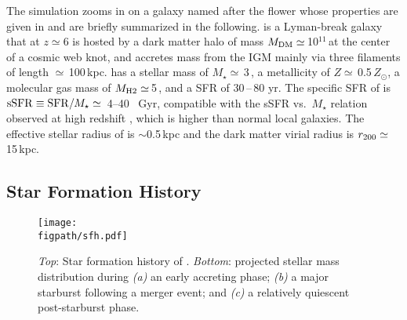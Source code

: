 \IfFileExists{emulateapjlegacy.cls}{\documentclass[iop]{emulateapjlegacy}}{\documentclass[iop]{emulateapj}}
\def\figpath{./Fig}
\begin{document}
The simulation zooms in on a galaxy named after the flower \flower whose properties are given in \citet{Pallottini17a} and are briefly summarized in the following. \flower is a Lyman-break galaxy that at $z\simeq 6$ is hosted by a dark matter halo of mass $M_{\rm DM}\simeq$\,10$^{11}$\,\Msun at the center of a cosmic web knot, and accretes mass from the IGM mainly via three filaments of length $\simeq$\,100\,kpc. \flower has a stellar mass of $M_\star\simeq$\,3\,\Msun, a metallicity of $Z\simeq$\,0.5\,$Z_{\odot}$, a molecular gas mass of $M_{\rm H2}\simeq$\,5\,\Msun, and a SFR of 30\,--\,80\,\Msun\,yr\pmOne.
%
The specific SFR of \flower is ${\rm sSFR} \equiv {\rm SFR}/M_{\star} \simeq$~4--40 ~Gyr\pmOne, compatible with the sSFR vs.\ $M_{\star}$ relation observed at high redshift \citep{Jiang2016}, which is higher than normal local galaxies. The effective stellar radius of \flower is $\sim$0.5\,kpc and the dark matter virial radius is $r_{\rm 200}\simeq$\,15\,kpc.

\subsection{Star Formation History} \label{sec:sfh}

\begin{figure*}
\centering
\texttt{[image: \\figpath/sfh.pdf]}
\caption{
    {\it Top}: Star formation history of \flower. {\it Bottom}:
    projected stellar mass distribution during {\it (a)} an early
    accreting phase;  {\it (b)} a major starburst following a merger
    event; and {\it (c)} a relatively quiescent post-starburst
    phase.
\label{fig:SFH}}
\end{figure*}
\end{document}
